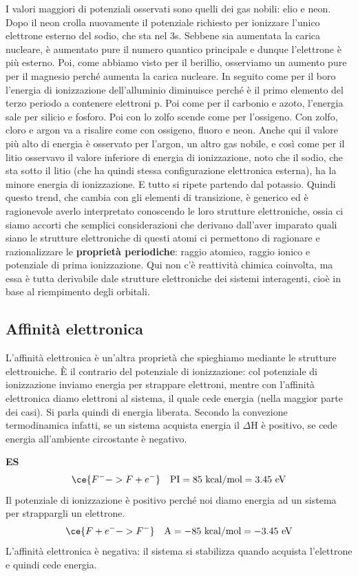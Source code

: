 I valori maggiori di potenziali osservati sono quelli dei gas nobili: elio e neon. Dopo il neon crolla nuovamente il potenziale richiesto per ionizzare l'unico elettrone esterno del sodio, che sta nel 3s. Sebbene sia aumentata la carica nucleare, è aumentato pure il numero quantico principale e dunque l'elettrone è più esterno. Poi, come abbiamo visto per il berillio, osserviamo un aumento pure per il magnesio perché aumenta la carica nucleare. In seguito come per il boro l'energia di ionizzazione dell'alluminio diminuisce perché è il primo elemento del terzo periodo a contenere elettroni p. Poi come per il carbonio e azoto, l'energia sale per silicio e fosforo. Poi con lo zolfo scende come per l'ossigeno. Con zolfo, cloro e argon va a risalire come con ossigeno, fluoro e neon. Anche qui il valore più alto di energia è osservato per l'argon, un altro gas nobile, e così come per il litio osservavo il valore inferiore di energia di ionizzazione, noto che il sodio, che sta sotto il litio (che ha quindi stessa configurazione elettronica esterna), ha la minore energia di ionizzazione. E tutto si ripete partendo dal potassio.
Quindi questo trend, che cambia con gli elementi di transizione, è generico ed è ragionevole averlo interpretato conoscendo le loro strutture elettroniche, ossia ci siamo accorti che semplici considerazioni che derivano dall'aver imparato quali siano le strutture elettroniche di questi atomi ci permettono di ragionare e razionalizzare le \textbf{proprietà periodiche}: raggio atomico, raggio ionico e potenziale di prima ionizzazione. 
Qui non c'è reattività chimica coinvolta, ma essa è tutta derivabile dale strutture elettroniche dei sistemi interagenti, cioè in base al riempimento degli orbitali.
\subsection{Affinità elettronica}
L'affinità elettronica è un'altra proprietà che spieghiamo mediante le strutture elettroniche. È il contrario del potenziale di ionizzazione: col potenziale di ionizzazione inviamo energia per strappare elettroni, mentre con l'affinità elettronica diamo elettroni al sistema, il quale cede energia (nella maggior parte dei casi). Si parla quindi di energia liberata. Secondo la convezione termodinamica infatti, se un sistema acquista energia il $\Delta$H è positivo, se cede energia all'ambiente circostante è negativo. 

\textbf{ES}
$$\ce{ F^- -> F + e^-}\quad \text{PI} = 85\,\,\text{kcal}/\text{mol}=3.45 \text{ eV}$$
Il potenziale di ionizzazione è positivo perché noi diamo energia ad un sistema per strappargli un elettrone.
$$\ce{ F + e^- -> F^-}\quad \text{A} =-85\,\,\text{kcal}/\text{mol}=-3.45 \text{ eV}$$
L'affinità elettronica è negativa: il sistema si stabilizza quando acquista l'elettrone e quindi cede energia.

